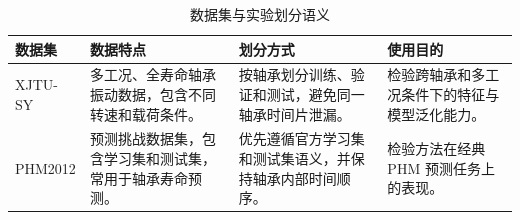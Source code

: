 \begin{table}[H]
\centering
\caption{数据集与实验划分语义}
\label{tab:dataset-summary}
\small
\begin{tabularx}{\textwidth}{p{2.6cm}p{4.0cm}p{3.8cm}Y}
\toprule
数据集 & 数据特点 & 划分方式 & 使用目的 \\
\midrule
XJTU-SY & 多工况、全寿命轴承振动数据，包含不同转速和载荷条件。 & 按轴承划分训练、验证和测试，避免同一轴承时间片泄漏。 & 检验跨轴承和多工况条件下的特征与模型泛化能力。 \\
PHM2012 & 预测挑战数据集，包含学习集和测试集，常用于轴承寿命预测。 & 优先遵循官方学习集和测试集语义，并保持轴承内部时间顺序。 & 检验方法在经典 PHM 预测任务上的表现。 \\
\bottomrule
\end{tabularx}
\end{table}
